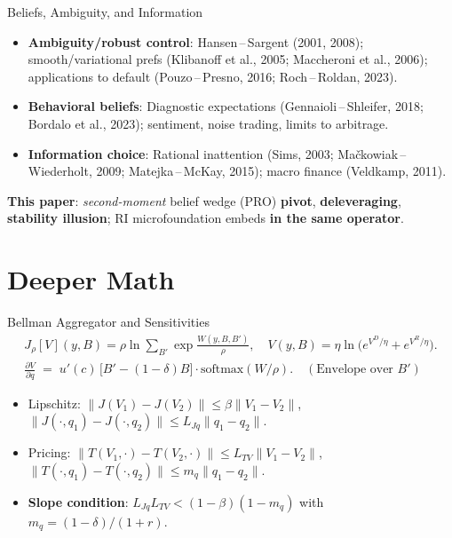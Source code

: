 \documentclass[aspectratio=169,11pt,professionalfonts]{beamer}
\newcommand{\1}{\mathbb{1}}
\begin{document}
\begin{frame}{Beliefs, Ambiguity, and Information}
  \begin{itemize}
    \item \textbf{Ambiguity/robust control}: Hansen\,–\,Sargent (2001, 2008);
          smooth/variational prefs (Klibanoff et al., 2005; Maccheroni et al., 2006);
          applications to default (Pouzo\,–\,Presno, 2016; Roch\,–\,Roldan, 2023).
    \item \textbf{Behavioral beliefs}: Diagnostic expectations (Gennaioli\,–\,Shleifer, 2018; Bordalo et al., 2023);
          sentiment, noise trading, limits to arbitrage.
    \item \textbf{Information choice}: Rational inattention (Sims, 2003; Mačkowiak\,–\,Wiederholt, 2009; Matejka\,–\,McKay, 2015);
          macro finance (Veldkamp, 2011).
  \end{itemize}
  \vspace{0.3em}
  \textbf{This paper}: \emph{second-moment} belief wedge (PRO) \Rightarrow \textbf{pivot}, \textbf{deleveraging}, \textbf{stability illusion};
  RI microfoundation embeds \textbf{in the same operator}.
\end{frame}

\section{Deeper Math}

\begin{frame}{Bellman Aggregator and Sensitivities}
  \begin{gather*}
    J_\rho[V](y,B)=\rho\ln\sum_{B'}\exp\tfrac{W(y,B,B')}{\rho},\quad V(y,B)=\eta\ln\Big(e^{V^D/\eta}+e^{V^R/\eta}\Big).\\
    \frac{\partial V}{\partial q}\;=\;u'(c)\,\big[B'-(1{-}\delta)B\big]\cdot \text{softmax}(W/\rho).\quad (\text{Envelope over } B')
  \end{gather*}
  \begin{itemize}
    \item Lipschitz: $\|J(V_1){-}J(V_2)\|\le\beta\|V_1{-}V_2\|$,
          $\|J(\cdot,q_1){-}J(\cdot,q_2)\|\le L_{Jq}\|q_1{-}q_2\|$.
    \item Pricing: $\|T(V_1,\cdot){-}T(V_2,\cdot)\|\le L_{TV}\|V_1{-}V_2\|$,
          $\|T(\cdot,q_1){-}T(\cdot,q_2)\|\le m_q\|q_1{-}q_2\|$.
    \item \textbf{Slope condition}: $L_{Jq}L_{TV}<(1-\beta)(1-m_q)$ with $m_q=(1-\delta)/(1+r)$.
  \end{itemize}
\end{frame}
\end{document}
